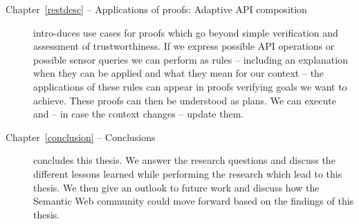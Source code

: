 \begin{description}
\item[Chapter~\ref{restdesc} -- Applications of proofs: Adaptive API composition]
intro-\linebreak duces use cases for proofs which go 
beyond simple verification and assessment of trustworthiness.
If we express possible API operations or possible sensor queries we can perform as rules -- including an explanation when they can be applied and what they mean 
for our context -- the applications of these rules can appear in proofs verifying goals we want to achieve. These proofs can then be understood as plans. 
We can execute and -- in case the context changes -- update them. 
% 
% 


\item[Chapter~\ref{conclusion} -- Conclusions]
concludes this thesis.  We answer the research questions and discuss the different lessons learned while performing the research which  lead to this thesis.
We then give an outlook to future work and discuss how the Semantic Web community could move forward based on the findings of this thesis.
% 



\end{description}
